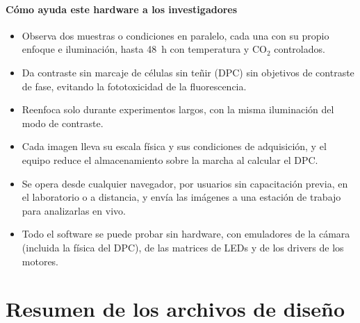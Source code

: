 \documentclass[preprint,12pt]{elsarticle}
\begin{document}
\paragraph{Cómo ayuda este hardware a los investigadores}
\begin{itemize}
\item Observa dos muestras o condiciones en paralelo, cada una con su
  propio enfoque e iluminación, hasta 48~h con temperatura y CO$_2$
  controlados.
\item Da contraste sin marcaje de células sin teñir (DPC) sin objetivos de
  contraste de fase, evitando la fototoxicidad de la fluorescencia.
\item Reenfoca solo durante experimentos largos, con la misma iluminación
  del modo de contraste.
\item Cada imagen lleva su escala física y sus condiciones de adquisición,
  y el equipo reduce el almacenamiento sobre la marcha al calcular el DPC.
\item Se opera desde cualquier navegador, por usuarios sin capacitación
  previa, en el laboratorio o a distancia, y envía las imágenes a una
  estación de trabajo para analizarlas en vivo.
\item Todo el software se puede probar sin hardware, con emuladores de la
  cámara (incluida la física del DPC), de las matrices de LEDs y de los
  drivers de los motores.
\end{itemize}

\section{Resumen de los archivos de diseño}
\end{document}
